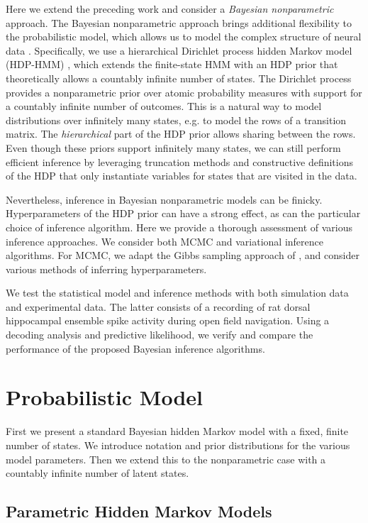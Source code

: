Here we extend the preceding work and consider a \emph{Bayesian nonparametric} approach.  The Bayesian nonparametric approach brings
additional flexibility to the probabilistic model, which allows us to
model the complex structure of neural data
\citep{Teh10,Wood08,Shalchyan14}.  Specifically, we use a hierarchical
Dirichlet process hidden Markov model (HDP-HMM) \citep{Teh06}, which
extends the finite-state HMM with an HDP prior that theoretically
allows a countably infinite number of states.  The Dirichlet process
provides a nonparametric prior over atomic probability measures with
support for a countably infinite number of outcomes. This is a natural
way to model distributions over infinitely many states, e.g. to model
the rows of a transition matrix.  The \emph{hierarchical} part of the
HDP prior allows sharing between the rows. Even though these priors
support infinitely many states, we can still perform efficient
inference by leveraging truncation methods and constructive
definitions of the HDP that only instantiate variables for states that
are visited in the data.

Nevertheless, inference in Bayesian nonparametric models can be
finicky.  Hyperparameters of the HDP prior can have a strong effect,
as can the particular choice of inference algorithm. Here we provide a
thorough assessment of various inference approaches. We consider both
MCMC and variational inference algorithms. For MCMC, we adapt the
Gibbs sampling approach of \citep{Teh06}, and consider various methods
of inferring hyperparameters.

We test the statistical model and inference methods with both
simulation data and experimental data. The latter consists of a
recording of rat dorsal hippocampal ensemble spike activity during
open field navigation. Using a decoding analysis and predictive
likelihood, we verify and compare the performance of the proposed
Bayesian inference algorithms. 

\section{Probabilistic Model}

First we present a standard Bayesian hidden Markov model with a fixed,
finite number of states. We introduce notation and prior distributions
for the various model parameters. Then we extend this to the nonparametric
case with a countably infinite number of latent states.

\subsection{Parametric Hidden Markov Models} 

